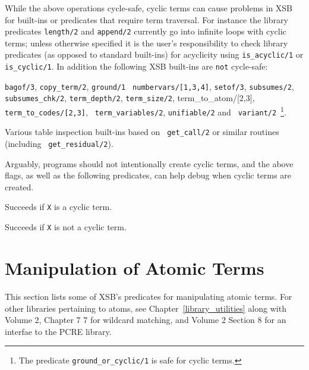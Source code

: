     While the above operations cycle-safe, cyclic terms can cause
    problems in XSB for built-ins or predicates that require term
    traversal.  For instance the library predicates {\tt length/2} and
    {\tt append/2} currently go into infinite loops with cyclic terms;
    unless otherwise specified it is the user's responsibility to
    check library predicates (as opposed to standard built-ins) for
    acyclicity using {\tt is\_acyclic/1} or {\tt is\_cyclic/1}.  In
    addition the following XSB built-ins are {\tt not} cycle-safe:

\bi
\item {\tt bagof/3}, {\tt copy\_term/2}, {\tt ground/1} {\tt
  numbervars/[1,3,4]}, {\tt setof/3}, {\tt subsumes/2}, {\tt
  subsumes\_chk/2}, {\tt term\_depth/2}, {\tt term\_size/2},
  {term\_to\_atom/[2,3]}, {\tt term\_to\_codes/[2,3]}, {\tt
    term\_variables/2}, {\tt unifiable/2} and {\tt
    variant/2}~\footnote{The predicate {\tt ground\_or\_cyclic/1} is
      safe for cyclic terms.}.
%
\item Various table inspection built-ins based on {\tt
        get\_call/2} or similar routines (including {\tt
        get\_residual/2}).
\ei

    Arguably, programs should not intentionally create cyclic terms,
    and the above flags, as well as the following predicates, can help
    debug when cyclic terms are created.

\begin{description}
    Succeeds if {\tt X} is a cyclic term.  
\end{description}

\begin{description}
    Succeeds if {\tt X} is not a cyclic term.  
\end{description}

\section{Manipulation of Atomic Terms}

This section lists some of XSB's predicates for manipulating atomic
terms.  For other libraries pertaining to atoms, see
Chapter~\ref{library_utilities} along with Volume 2, Chapter 7 7 for
wildcard matching, and Volume 2 Section 8 for an interfae to the PCRE
library.

